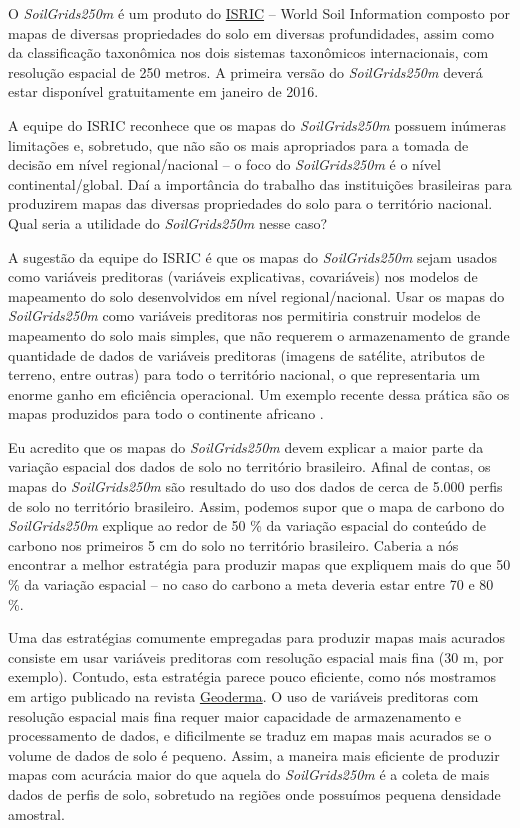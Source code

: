O \textit{SoilGrids250m} é um produto do \href{http://www.isric.org/}{ISRIC} -- 
World Soil Information composto por mapas de diversas propriedades do solo em 
diversas profundidades, assim como da classificação taxonômica nos dois sistemas
taxonômicos internacionais, com resolução espacial de 250 metros. A primeira 
versão do \textit{SoilGrids250m} deverá estar disponível gratuitamente em 
janeiro de 2016.

A equipe do ISRIC reconhece que os mapas do \textit{SoilGrids250m} possuem 
inúmeras limitações e, sobretudo, que não são os mais apropriados para a tomada 
de decisão em nível regional/nacional -- o foco do \textit{SoilGrids250m} é o 
nível continental/global. Daí a importância do trabalho das instituições 
brasileiras para produzirem mapas das diversas propriedades do solo para o 
território nacional. Qual seria a utilidade do \textit{SoilGrids250m} nesse 
caso?

A sugestão da equipe do ISRIC é que os mapas do \textit{SoilGrids250m} sejam 
usados como variáveis preditoras (variáveis explicativas, covariáveis) nos 
modelos de mapeamento do solo desenvolvidos em nível regional/nacional. Usar os 
mapas do \textit{SoilGrids250m} como variáveis preditoras nos permitiria 
construir modelos de mapeamento do solo mais simples, que não requerem o 
armazenamento de grande quantidade de dados de variáveis preditoras (imagens de 
satélite, atributos de terreno, entre outras) para todo o território nacional, 
o que representaria um enorme ganho em eficiência operacional. Um exemplo 
recente dessa prática são os mapas produzidos para todo o continente africano 
\cite{HenglEtAl2015}.

Eu acredito que os mapas do \textit{SoilGrids250m} devem explicar a maior parte 
da variação espacial dos dados de solo no território brasileiro. Afinal de 
contas, os mapas do \textit{SoilGrids250m} são resultado do uso dos dados de 
cerca de 5.000 perfis de solo no território brasileiro. Assim, podemos supor 
que o mapa de carbono do \textit{SoilGrids250m} explique ao redor de 50 \% da 
variação espacial do conteúdo de carbono nos primeiros 5 cm do solo no 
território brasileiro. Caberia a nós encontrar a melhor estratégia para produzir
mapas que expliquem mais do que 50 \% da variação espacial -- no caso do carbono
a meta deveria estar entre 70 e 80 \%.

Uma das estratégias comumente empregadas para produzir mapas mais acurados 
consiste em usar variáveis preditoras com resolução espacial mais fina (30 m, 
por exemplo). Contudo, esta estratégia parece pouco eficiente, como nós 
mostramos em artigo publicado na revista
 \href{http://www.sciencedirect.com/science/article/pii/S001670611400456X}{Geoderma}.
O uso de variáveis preditoras com resolução espacial mais fina requer maior 
capacidade de armazenamento e processamento de dados, e dificilmente se traduz
em mapas mais acurados se o volume de dados de solo é pequeno. Assim, a maneira
mais eficiente de produzir mapas com acurácia maior do que aquela do 
\textit{SoilGrids250m} é a coleta de mais dados de perfis de solo, sobretudo na 
regiões onde possuímos pequena densidade amostral.


